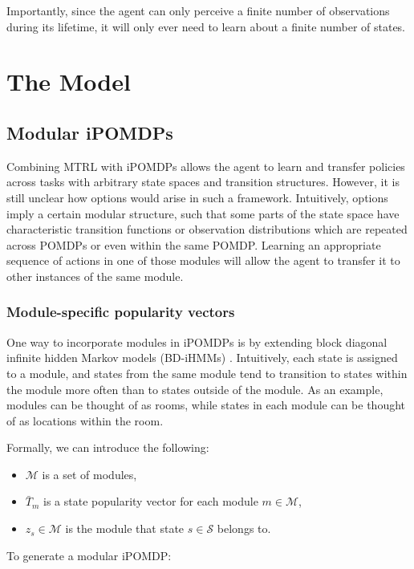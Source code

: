 \documentclass[11pt]{article}
\begin{document}
Importantly, since the agent can only perceive a finite number of observations during its lifetime, it will only ever need to learn about a finite number of states.

\section{The Model}

\subsection{Modular iPOMDPs}

Combining MTRL with iPOMDPs allows the agent to learn and transfer policies across tasks with arbitrary state spaces and transition structures. However, it is still unclear how options would arise in such a framework. Intuitively, options imply a certain modular structure, such that some parts of the state space have characteristic transition functions or observation distributions which are repeated across POMDPs or even within the same POMDP. Learning an appropriate sequence of actions in one of those modules will allow the agent to transfer it to other instances of the same module. 

\subsubsection{Module-specific popularity vectors}

One way to incorporate modules in iPOMDPs is by extending block diagonal infinite hidden Markov models (BD-iHMMs) \cite{Stepleton2009}. Intuitively, each state is assigned to a module, and states from the same module tend to transition to states within the module more often than to states outside of the module. As an example, modules can be thought of as rooms, while states in each module can be thought of as locations within the room.

Formally, we can introduce the following:

\begin{itemize}
\item $\mathcal{M}$ is a set of modules,
\item $\bar{T}_m$ is a state popularity vector for each module $m \in \mathcal{M}$,
\item $z_s \in \mathcal{M}$ is the module that state $s \in \mathcal{S}$ belongs to.
\end{itemize}

To generate a modular iPOMDP:
\end{document}
